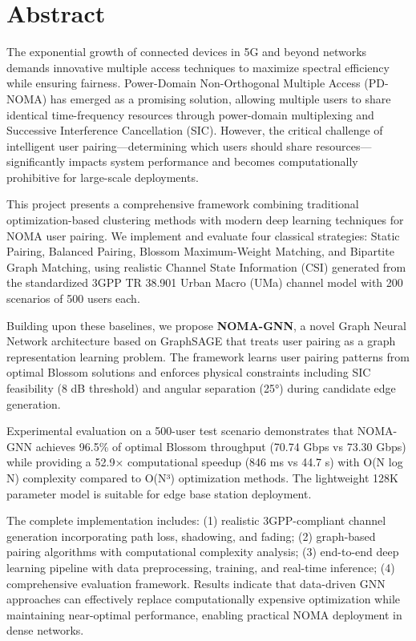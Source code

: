 \chapter*{Abstract}

\vspace{0.5cm}

The exponential growth of connected devices in 5G and beyond networks demands innovative multiple access techniques to maximize spectral efficiency while ensuring fairness. Power-Domain Non-Orthogonal Multiple Access (PD-NOMA) has emerged as a promising solution, allowing multiple users to share identical time-frequency resources through power-domain multiplexing and Successive Interference Cancellation (SIC). However, the critical challenge of intelligent user pairing—determining which users should share resources—significantly impacts system performance and becomes computationally prohibitive for large-scale deployments.

This project presents a comprehensive framework combining traditional optimization-based clustering methods with modern deep learning techniques for NOMA user pairing. We implement and evaluate four classical strategies: Static Pairing, Balanced Pairing, Blossom Maximum-Weight Matching, and Bipartite Graph Matching, using realistic Channel State Information (CSI) generated from the standardized 3GPP TR 38.901 Urban Macro (UMa) channel model with 200 scenarios of 500 users each.

Building upon these baselines, we propose \textbf{NOMA-GNN}, a novel Graph Neural Network architecture based on GraphSAGE that treats user pairing as a graph representation learning problem. The framework learns user pairing patterns from optimal Blossom solutions and enforces physical constraints including SIC feasibility (8 dB threshold) and angular separation (25°) during candidate edge generation.

Experimental evaluation on a 500-user test scenario demonstrates that NOMA-GNN achieves 96.5\% of optimal Blossom throughput (70.74 Gbps vs 73.30 Gbps) while providing a 52.9× computational speedup (846 ms vs 44.7 s) with O(N log N) complexity compared to O(N³) optimization methods. The lightweight 128K parameter model is suitable for edge base station deployment.

The complete implementation includes: (1) realistic 3GPP-compliant channel generation incorporating path loss, shadowing, and fading; (2) graph-based pairing algorithms with computational complexity analysis; (3) end-to-end deep learning pipeline with data preprocessing, training, and real-time inference; (4) comprehensive evaluation framework. Results indicate that data-driven GNN approaches can effectively replace computationally expensive optimization while maintaining near-optimal performance, enabling practical NOMA deployment in dense networks.

